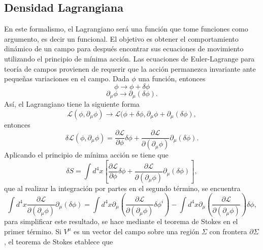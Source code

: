 \documentclass[a4paper,openright,12pt]{book}
\begin{document}
\subsection*{Densidad Lagrangiana}
En este formalismo, el Lagrangiano será una función que tome funciones como argumento, es decir un funcional. El objetivo es obtener el comportamiento dinámico de un campo para después encontrar sus ecuaciones de movimiento utilizando el principio de mínima acción. Las ecuaciones de Euler-Lagrange para teoría de campos provienen de requerir que la acción permanezca invariante ante pequeñas variaciones en el campo. Dada $\phi$ una función, entonces
\begin{equation}
\phi \rightarrow \phi + \delta\phi\label{A3}
\end{equation}
\begin{equation}
\partial_{\mu}\phi \rightarrow \partial_{\mu}(\delta\phi).\label{A4}
\end{equation}
Así, el Lagrangiano tiene la siguiente forma
\begin{equation}
\mathcal{L}(\phi,\partial_{\mu}\phi) \rightarrow \mathcal{L}(\phi + \delta\phi, \partial_{\mu}\phi + \partial_{\mu}(\delta\phi),\label{A5}
\end{equation}
entonces
\begin{equation}
\delta \mathcal{L}(\phi,\partial_{\mu}\phi) = \frac{\partial \mathcal{L}}{\partial \phi}\delta\phi + \frac{\partial \mathcal{L}}{\partial(\partial_{\mu}\phi)}\partial_{\mu}(\delta\phi).\label{A6}
\end{equation}
Aplicando el principio de mínima acción se tiene que
\begin{equation}
\delta S = \int d^{4}x \left[\frac{\partial \mathcal{L}}{\partial \phi}\delta\phi + \frac{\partial \mathcal{L}}{\partial(\partial_{\mu}\phi)}\partial_{\mu}(\delta\phi)\right],\label{A7}
\end{equation}
que al realizar la integración por partes en el segundo término, se encuentra
\begin{equation}
\int d^{4}x \frac{\partial \mathcal{L}}{\partial(\partial_{\mu}\phi)}\partial_{\mu}(\delta\phi)
 = 
 \int d^{4}x\partial_{\mu}\left(\frac{\partial\mathcal{L}}{\partial(\partial_{\mu}\phi)}\delta\phi^{i}\right)
 -
 \int d^{4}x\partial_{\mu}\left(\frac{\partial\mathcal{L}}{\partial(\partial_{\mu}\phi)}\right)\delta\phi,\label{A8}
\end{equation}
para simplificar este resultado, se hace mediante el teorema de Stokes en el primer término. Si $V^{\mu}$ es un vector del campo sobre una región $\Sigma$ con frontera $\partial\Sigma$, el teorema de Stokes etablece que 
\end{document}
